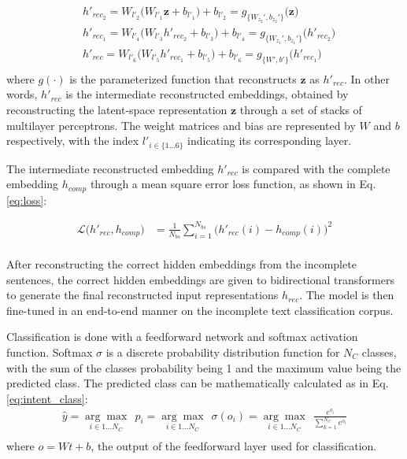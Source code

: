 \documentclass[review]{elsarticle}
\begin{document}
\begin{equation} \label{eq:autoencoder2}
\begin{aligned}
&h'_{rec_2} = W_{l'_2} \big(W_{l'_1} \mathbf{z} + b_{l'_1}\big) + b_{l'_2} = g_{\{W_{z_2}',b_{z_2}'\}}\big(\mathbf{z}\big)\\
&h'_{rec_1} = W_{l'_4} \big(W_{l'_3} h'_{rec_2} + b_{l'_3}\big) + b_{l'_4} = g_{\{W_{z_1}',b_{z_1}'\}}\big(h'_{rec_2}\big)\\
&h'_{rec} = W_{l'_6} \big(W_{l'_5} h'_{rec_1} + b_{l'_5}\big) + b_{l'_6} = g_{\{W',b'\}}\big(h'_{rec_1}\big)\\
\end{aligned}
\end{equation}
where $g(\cdot)$ is the parameterized function that reconstructs $\mathbf{z}$ as $h'_{rec}$. In other words, $h'_{rec}$ is the intermediate reconstructed embeddings, obtained by reconstructing the latent-space representation $\mathbf{z}$ through a set of stacks of multilayer perceptrons. The weight matrices and bias are represented by $W$ and $b$ respectively, with the index $l'_{i \in \{1\dots6\}}$ indicating its corresponding layer.

The intermediate reconstructed embedding $h'_{rec}$ is compared with the complete embedding $h_{comp}$ through a mean square error loss function, as shown in Eq. \eqref{eq:loss}:

\begin{equation} \label{eq:loss}
\begin{aligned}
\mathcal{L}\big(h'_{rec}, h_{comp}\big) &= \frac{1}{N_{bs}} \sum_{i=1}^{N_{bs}} \Big(h'_{rec}(i) - h_{comp}(i)\Big)^2 \\
\end{aligned}
\end{equation}

After reconstructing the correct hidden embeddings from the incomplete sentences, the correct hidden embeddings are given to bidirectional transformers to generate the final reconstructed input representations $h_{rec}$. The model is then fine-tuned in an end-to-end manner on the incomplete text classification corpus.

Classification is done with a feedforward network and softmax activation function. Softmax $\sigma$ is a discrete probability distribution function for $N_C$ classes, with the sum of the classes probability being 1 and the maximum value being the predicted class. The predicted class can be mathematically calculated as in Eq. \eqref{eq:intent_class}:
\begin{equation} \label{eq:intent_class}
\begin{aligned}
\hat{y} = \underset{i \in 1... N_C}{\arg\max} \ \ p_i = \underset{i \in 1... N_C}{\arg\max} \ \ \sigma(o_i) = \underset{i \in 1... N_C}{\arg\max} \ \ \frac{e^{o_i}}{\sum_{k=1}^{N_C} e^{o_i}} \\
\end{aligned}
\end{equation}
where $o = W t + b$, the output of the feedforward layer used for classification.
\end{document}
